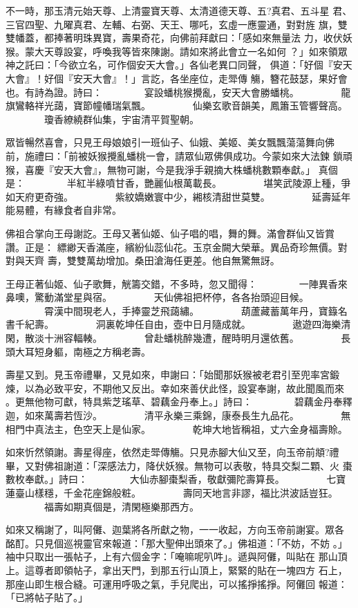 \begin{pinyinscope}
{不一時，那玉清元始天尊、上清靈寶天尊、太清道德天尊、五?真君、五斗星
君、三官四聖、九曜真君、左輔、右弼、天王、哪吒，玄虛一應靈通，對對旌
旗，雙雙幡蓋，都捧著明珠異寶，壽果奇花，向佛前拜獻曰：「感如來無量法
力，收伏妖猴。蒙大天尊設宴，呼喚我等皆來陳謝。請如來將此會立一名如何
？」如來領眾神之託曰：「今欲立名，可作個安天大會。」各仙老異口同聲，
俱道：「好個『安天大會』！好個『安天大會』！」言訖，各坐座位，走斝傳
觴，簪花鼓瑟，果好會也。有詩為證。詩曰：
　　　　宴設蟠桃猴攪亂，安天大會勝蟠桃。
　　　　龍旗鸞輅祥光藹，寶節幢幡瑞氣飄。
　　　　仙樂玄歌音韻美，鳳簫玉管響聲高。
　　　　瓊香繚繞群仙集，宇宙清平賀聖朝。

眾皆暢然喜會，只見王母娘娘引一班仙子、仙娥、美姬、美女飄飄蕩蕩舞向佛
前，施禮曰：「前被妖猴攪亂蟠桃一會，請眾仙眾佛俱成功。今蒙如來大法鍊
鎖頑猴，喜慶『安天大會』，無物可謝，今是我淨手親摘大株蟠桃數顆奉獻。」
真個是：
　　　　半紅半綠噴甘香，艷麗仙根萬載長。
　　　　堪笑武陵源上種，爭如天府更奇強。
　　　　紫紋嬌嫩寰中少，緗核清甜世莫雙。
　　　　延壽延年能易體，有緣食者自非常。

佛祖合掌向王母謝訖。王母又著仙姬、仙子唱的唱，舞的舞。滿會群仙又皆賞
讚。正是：
縹緲天香滿座，繽紛仙蕊仙花。玉京金闕大榮華。異品奇珍無價。對對與天齊
壽，雙雙萬劫增加。桑田滄海任更差。他自無驚無訝。

王母正著仙姬、仙子歌舞，觥籌交錯，不多時，忽又聞得：
　　　　一陣異香來鼻噢，驚動滿堂星與宿。
　　　　天仙佛祖把杯停，各各抬頭迎目候。
　　　　霄漢中間現老人，手捧靈芝飛藹繡。
　　　　葫蘆藏蓄萬年丹，寶籙名書千紀壽。
　　　　洞裏乾坤任自由，壺中日月隨成就。
　　　　遨遊四海樂清閑，散淡十洲容輻輳。
　　　　曾赴蟠桃醉幾遭，醒時明月還依舊。
　　　　長頭大耳短身軀，南極之方稱老壽。

壽星又到。見玉帝禮畢，又見如來，申謝曰：「始聞那妖猴被老君引至兜率宮鍛
煉，以為必致平安，不期他又反出。幸如來善伏此怪，設宴奉謝，故此聞風而來
。更無他物可獻，特具紫芝瑤草、碧藕金丹奉上。」詩曰：
　　　　碧藕金丹奉釋迦，如來萬壽若恆沙。
　　　　清平永樂三乘錦，康泰長生九品花。
　　　　無相門中真法主，色空天上是仙家。
　　　　乾坤大地皆稱祖，丈六金身福壽賒。

如來忻然領謝。壽星得座，依然走斝傳觴。只見赤腳大仙又至，向玉帝前頫?禮
畢，又對佛祖謝道：「深感法力，降伏妖猴。無物可以表敬，特具交梨二顆、火
棗數枚奉獻。」詩曰：
　　　　大仙赤腳棗梨香，敬獻彌陀壽算長。
　　　　七寶蓮臺山樣穩，千金花座錦般粧。
　　　　壽同天地言非謬，福比洪波話豈狂。
　　　　福壽如期真個是，清閑極樂那西方。

如來又稱謝了，叫阿儺、迦葉將各所獻之物，一一收起，方向玉帝前謝宴。眾各
酩酊。只見個巡視靈官來報道：「那大聖伸出頭來了。」佛祖道：「不妨，不妨
。」袖中只取出一張帖子，上有六個金字：「唵嘛呢叭吽」。遞與阿儺，叫貼在
那山頂上。這尊者即領帖子，拿出天門，到那五行山頂上，緊緊的貼在一塊四方
石上，那座山即生根合縫。可運用呼吸之氣，手兒爬出，可以搖掙搖掙。阿儺回
報道：「已將帖子貼了。」

}
\end{pinyinscope}
